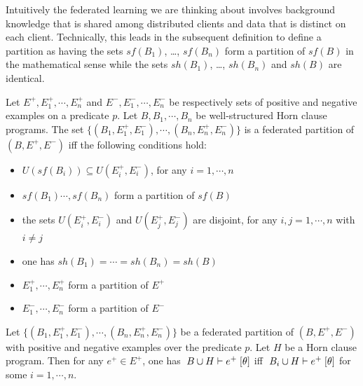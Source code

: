 Intuitively the federated learning we are thinking about involves
background knowledge that is shared among 
distributed clients and data that is distinct on each client. Technically, this leads in the subsequent definition to define a partition as having the sets $sf(B_1)$, \ldots, $sf(B_n)$ form a partition of $sf(B)$ in the mathematical sense while  the
sets $sh(B_1)$, \ldots,  $sh(B_n)$ and $sh(B)$ are identical.


\begin{definition}
\label{defn-ilp-partition}
Let $E^+, E_1^+, \cdots, E_n^+$ and $E^-, E_1^-, \cdots, E_n^-$ be respectively sets of positive and negative examples on a predicate $p$. Let $B, B_1, \cdots, B_n$ be well-structured Horn clause programs. The set 
\( \{ (B_1, E_1^+,E_1^-), \cdots, (B_n, E_n^+,E_n^-) \}
\)
is a federated partition of $(B, E^+,E^-)$ iff the following conditions hold:

\begin{itemize}
\item $U(sf(B_i)) \subseteq U(E_i^+,E_i^-)$, for any $i=1, \cdots, n$
\item $sf(B_1) \cdots, sf(B_n)$ form a partition of $sf(B)$
\item the sets $U(E_i^+,E_i^-)$ and $U(E_j^+,E_j^-)$ are disjoint, for any 
      $i,j=1, \cdots, n$ with $i \not= j$
\item one has $sh(B_1) = \cdots = sh(B_n) = sh(B)$
\item $E_1^+, \cdots, E_n^+$ form a partition of $E^+$
\item $E_1^-, \cdots, E_n^-$ form a partition of $E^-$
\end{itemize}
\end{definition}
 
\begin{proposition}
\label{key-prop-pos}
Let \( \{ (B_1, E_1^+,E_1^-), \cdots, (B_n, E_n^+,E_n^-) \}
\)
be a federated partition of $(B, E^+,E^-)$ with positive and negative examples over the predicate $p$. Let $H$ be a Horn clause program. Then for any $e^+ \in E^+$, one has  \( \mbox{$\; {B \cup H} \vdash {e^+} \; [{\theta}] $} \) iff 
\( \mbox{$\; {B_i \cup H} \vdash {e^+} \; [{\theta}] $} \) for some $i=1, \cdots, n$.
\end{proposition}


